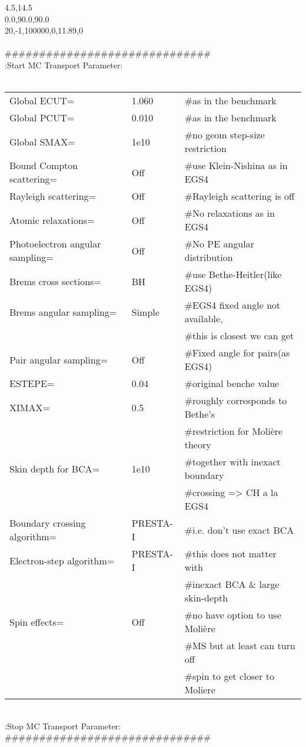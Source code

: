 \begin{flushleft}
{4.5,14.5 \\
0.0,90.0,90.0 \\
20,-1,100000,0,11.89,0 \\
~\\
\#\#\#\#\#\#\#\#\#\#\#\#\#\#\#\#\#\#\#\#\#\#\#\#\#\#\#\#\#\# \\
:Start MC Transport Parameter: \\
~\\
\begin{tabular}{lll}
Global ECUT= & 1.060 & \#as in the benchmark \\
Global PCUT= & 0.010 & \#as in the benchmark \\
Global SMAX= & 1e10  & \#no geom step-size restriction \\
Bound Compton scattering= & Off & \#use Klein-Nishina as in EGS4\\
Rayleigh scattering=      & Off & \#Rayleigh scattering is off\\
Atomic relaxations= & Off & \#No relaxations as in EGS4 \\
Photoelectron angular sampling= & Off & \#No PE angular distribution \\
Brems cross sections=  &   BH  & \#use Bethe-Heitler(like EGS4) \\
Brems angular sampling= &  Simple & \#EGS4 fixed angle not available,\\
                        & &         \#this is closest we can get \\
Pair angular sampling=  & Off  & \#Fixed angle for pairs(as EGS4)\\
ESTEPE=         & 0.04 & \#original benche value \\
XIMAX=          & 0.5  & \#roughly corresponds to Bethe's \\
& &                      \#restriction for Moli{\`e}re theory \\
Skin depth for BCA= & 1e10 & \#together with inexact boundary \\
& & \#crossing => CH a la EGS4 \\
Boundary crossing algorithm= & PRESTA-I & \#i.e. don't use exact BCA \\
Electron-step algorithm=     & PRESTA-I & \#this does not matter with \\
& & \#inexact BCA \& large skin-depth  \\
Spin effects= &  Off  & \#no have option to use Moli{\`e}re \\
& &                     \#MS but at least can turn off \\
& &                     \#spin to get closer to Moliere  \\
\end{tabular}
~\\
:Stop MC Transport Parameter: \\
\#\#\#\#\#\#\#\#\#\#\#\#\#\#\#\#\#\#\#\#\#\#\#\#\#\#\#\#\#\# }
\end{flushleft}

